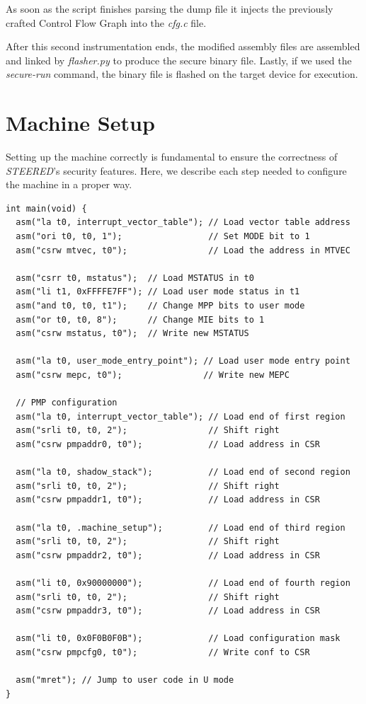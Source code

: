 As soon as the script finishes parsing the dump file it injects the previously
crafted Control Flow Graph into the \textit{cfg.c} file.

After this second instrumentation ends, the modified assembly files are
assembled and linked by \textit{flasher.py} to produce the secure binary file.
Lastly, if we used the \textit{secure-run} command, the binary file is flashed on
the target device for execution.

\section{Machine Setup}
\label{sec:project_setup}

Setting up the machine correctly is fundamental to ensure the correctness of
\textit{STEERED}'s security features. Here, we describe each step needed to configure
the machine in a proper way. \\
\begin{lstlisting}[style=CStyle, caption = Machine setup, label={lst:setup}]
int main(void) {
  asm("la t0, interrupt_vector_table"); // Load vector table address
  asm("ori t0, t0, 1");                 // Set MODE bit to 1
  asm("csrw mtvec, t0");                // Load the address in MTVEC

  asm("csrr t0, mstatus");  // Load MSTATUS in t0
  asm("li t1, 0xFFFFE7FF"); // Load user mode status in t1
  asm("and t0, t0, t1");    // Change MPP bits to user mode
  asm("or t0, t0, 8");      // Change MIE bits to 1
  asm("csrw mstatus, t0");  // Write new MSTATUS

  asm("la t0, user_mode_entry_point"); // Load user mode entry point
  asm("csrw mepc, t0");                // Write new MEPC

  // PMP configuration
  asm("la t0, interrupt_vector_table"); // Load end of first region
  asm("srli t0, t0, 2");                // Shift right
  asm("csrw pmpaddr0, t0");             // Load address in CSR

  asm("la t0, shadow_stack");           // Load end of second region
  asm("srli t0, t0, 2");                // Shift right
  asm("csrw pmpaddr1, t0");             // Load address in CSR

  asm("la t0, .machine_setup");         // Load end of third region
  asm("srli t0, t0, 2");                // Shift right
  asm("csrw pmpaddr2, t0");             // Load address in CSR

  asm("li t0, 0x90000000");             // Load end of fourth region
  asm("srli t0, t0, 2");                // Shift right
  asm("csrw pmpaddr3, t0");             // Load address in CSR

  asm("li t0, 0x0F0B0F0B");             // Load configuration mask
  asm("csrw pmpcfg0, t0");              // Write conf to CSR

  asm("mret"); // Jump to user code in U mode
}
\end{lstlisting}


